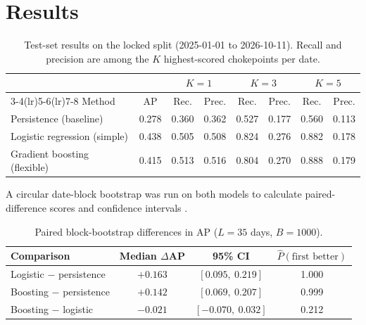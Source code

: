 \documentclass[11pt]{article}
\begin{document}
\section{Results}  %


\begin{table}[h]
\centering\small
\begin{tabular}{lccccccc}
\toprule
 & & \multicolumn{2}{c}{$K=1$} & \multicolumn{2}{c}{$K=3$} & \multicolumn{2}{c}{$K=5$} \\
\cmidrule(lr){3-4}\cmidrule(lr){5-6}\cmidrule(lr){7-8}
Method & AP & Rec. & Prec. & Rec. & Prec. & Rec. & Prec. \\
\midrule
Persistence (baseline)       & 0.278 & 0.360 & 0.362 & 0.527 & 0.177 & 0.560 & 0.113 \\
Logistic regression (simple) & 0.438 & 0.505 & 0.508 & 0.824 & 0.276 & 0.882 & 0.178 \\
Gradient boosting (flexible) & 0.415 & 0.513 & 0.516 & 0.804 & 0.270 & 0.888 & 0.179 \\
\bottomrule
\end{tabular}
\caption{Test-set results on the locked split (2025-01-01 to 2026-10-11). Recall and precision are among the $K$ highest-scored chokepoints per date. }
\label{tab:headline}
\end{table}

A circular date-block bootstrap was run on both models to calculate paired-difference scores and confidence intervals \cite{politis}. 
\begin{table}[h]
\centering\small
\begin{tabular}{lccc}
\toprule
Comparison & Median $\Delta$AP & 95\% CI & $\widehat{P}(\text{first better})$ \\
\midrule
Logistic $-$ persistence & $+0.163$ & $[0.095,\ 0.219]$ & 1.000 \\
Boosting $-$ persistence & $+0.142$ & $[0.069,\ 0.207]$ & 0.999 \\
Boosting $-$ logistic    & $-0.021$ & $[-0.070,\ 0.032]$ & 0.212 \\
\bottomrule
\end{tabular}
\caption{Paired block-bootstrap differences in AP ($L=35$ days, $B=1000$).}
\label{tab:paired}
\end{table}
\end{document}
